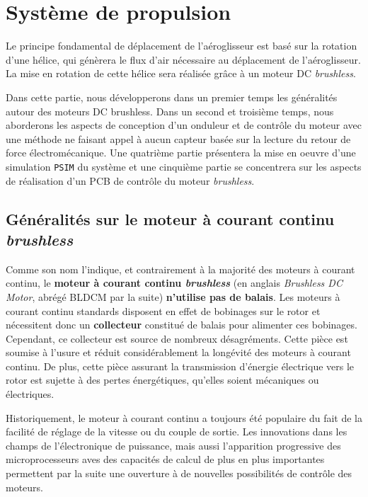 	\chapter{Système de propulsion}

	Le principe fondamental de déplacement de l'aéroglisseur est basé 
	sur la rotation d'une hélice, qui génèrera le flux d'air nécessaire
	au déplacement de l'aéroglisseur. La mise en rotation de cette hélice
	sera réalisée grâce à un moteur DC \textit{brushless}. 
			
	Dans cette partie, nous développerons dans un premier temps les 
	généralités autour des moteurs DC brushless. Dans un second et 
	troisième temps, nous aborderons les aspects de conception d'un 
	onduleur et de contrôle du moteur avec une méthode ne faisant appel
	à aucun capteur basée sur la lecture du retour de force 
	électromécanique. Une quatrième partie présentera la mise en oeuvre
	d'une simulation \texttt{PSIM} du système et une cinquième partie 
	se concentrera sur les aspects de réalisation d'un PCB de contrôle
	du moteur \textit{brushless}.
	
		\vspace{-1em}
			
		\section{Généralités sur le moteur à courant continu \textit{brushless}}
			
		Comme son nom l'indique, et contrairement à la majorité des moteurs
		à courant continu, le \textbf{moteur à courant continu \textit{brushless}} 
		(en anglais \textit{Brushless DC Motor}, abrégé BLDCM par la suite) 
		\textbf{n'utilise pas de balais}. 
		Les moteurs à courant continu standards disposent en effet de bobinages
		sur le rotor et nécessitent donc un \textbf{collecteur} constitué de
		balais pour alimenter ces bobinages. Cependant, ce collecteur est source
		de nombreux désagréments. Cette pièce est soumise à l'usure et réduit
		considérablement la longévité des moteurs à courant continu. 
		De plus, cette pièce assurant la transmission d'énergie électrique vers
		le rotor est sujette à des pertes énergétiques, qu'elles soient 
		mécaniques ou électriques. 
		
		Historiquement, le moteur à courant continu a toujours été populaire
		du fait de la facilité de réglage de la vitesse ou du couple de sortie. 
		Les innovations dans les champs
		de l'électronique de puissance, mais aussi l'apparition progressive
		des microprocesseurs aves des capacités de calcul de plus en plus 
		importantes permettent par la suite une ouverture à de nouvelles 
		possibilités de contrôle des moteurs. 
	
